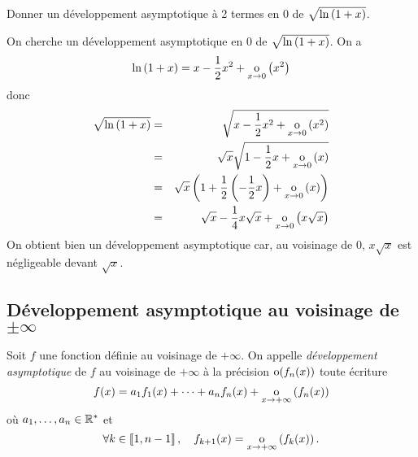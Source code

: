 \documentclass{magnoliaold}
\begin{document}
\begin{exoUnique}
\exo Donner un développement asymptotique à 2 termes en 0 de
  $\sqrt{\ln\left(1+x\right)}$.
  \begin{sol}
  On cherche un développement asymptotique en 0 de $\sqrt{\ln\left(1+x\right)}$.
  On a
  \[\ln\left(1+x\right)=x-\frac{1}{2}x^2+\underset{x \rightarrow 0}{\text{o}}\left(x^2\right)\]
  donc
  \begin{eqnarray*}
  \sqrt{\ln\left(1+x\right)}
  &=& \sqrt{x-\frac{1}{2}x^2+\underset{x \rightarrow 0}{\text{o}}\left(x^2\right)}\\
  &=& \sqrt{x}\sqrt{1-\frac{1}{2}x+\underset{x \rightarrow 0}{\text{o}}\left(x\right)}\\
  &=& \sqrt{x}\left(1+\frac{1}{2}\left(-\frac{1}{2}x\right)+\underset{x \rightarrow 0}{\text{o}}\left(x\right)\right)\\
  &=& \sqrt{x}-\frac{1}{4}x\sqrt{x}+\underset{x \rightarrow 0}{\text{o}}\left(x\sqrt{x}\right)
  \end{eqnarray*}
  On obtient bien un développement asymptotique car, au voisinage de 0,
  $x\sqrt{x}$ est négligeable devant $\sqrt{x}$.    
  \end{sol}
\end{exoUnique}

\subsection{Développement asymptotique au voisinage de $\pm\infty$}

\begin{definition}[utile=-3]
Soit $f$ une fonction définie au voisinage de $+\infty$. On appelle \emph{développement
asymptotique} de $f$ au voisinage de $+\infty$ à la précision ${\rm o}(f_n(x))$ toute
écriture
\[f(x)=a_1 f_1(x)+\cdots+a_n f_n(x)+\underset{x \rightarrow +\infty}{\text{o}}\left(f_n(x)\right)\]
où $a_1,\ldots,a_n\in{\mathbb{R}^*}$ et
\[\forall k\in\left\llbracket 1,n-1\right\rrbracket ,\quad f_{k+1}(x)=\underset{x \rightarrow +\infty}{\text{o}}\left(f_k(x)\right).\]
\end{definition}
\end{document}

